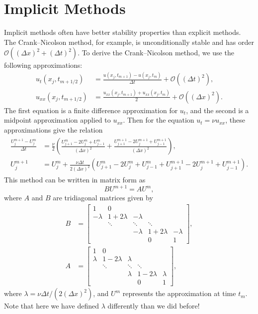 \section*{Implicit Methods}

Implicit methods often have better stability properties than explicit methods.
The Crank--Nicolson method, for example, is unconditionally stable and has order $\mathcal{O}\left( (\Delta x)^2 + (\Delta t)^2 \right)$.
To derive the Crank--Nicolson method, we use the following approximations:
\begin{align*}
	u_t(x_j,t_{m+1/2}) &= \frac{u(x_j,t_{m+1}) - u(x_j,t_m)}{\Delta t} + \mathcal{O}\left( (\Delta t)^2 \right), \\
	u_{xx}(x_j,t_{m+1/2}) &= \frac{u_{xx}(x_j,t_{m+1}) + u_{xx}(x_j,t_m)}{2} + \mathcal{O}\left( (\Delta x)^2 \right).
\end{align*}
The first equation is a finite difference approximation for $u_t$, and the second is a midpoint approximation applied to $u_{xx}$.
Then for the equation $u_t = \nu u_{xx}$, these approximations give the relation
\begin{align}
	\begin{split}
	\frac{U^{m+1}_j - U^m_j}{\Delta t} &= \frac{\nu}{2}\left( \frac{U^m_{j+1} - 2U^m_{j} + U^m_{j-1}}{(\Delta x)^2} + \frac{U^{m+1}_{j+1} - 2U^{m+1}_{j} + U^{m+1}_{j-1}}{(\Delta x)^2}  \right) ,\\
	U^{m+1}_j  &= U^m_j + \frac{\nu \Delta t}{2 (\Delta x)^2} \left( U^m_{j+1} - 2U^m_{j} + U^m_{j-1} + U^{m+1}_{j+1} - 2U^{m+1}_{j} + U^{m+1}_{j-1}   \right).
\end{split}
\end{align}
This method can be written in matrix form as
\[BU^{m+1} = A U^m,\]
where $A$ and $B$ are tridiagonal matrices given by
\begin{align*}
B &= \left[\begin{array}{cccccc}1 & 0 &  &  &  \\ -\lambda & 1+2\lambda &  -\lambda & &  \\ &  \ddots &   \ddots & \ddots \\ & &  -\lambda &  1+2\lambda & -\lambda \\ &  &  & 0 & 1\end{array}\right], \\
A &= \left[\begin{array}{cccccc}1 & 0 &  &  &  \\ \lambda & 1-2\lambda &  \lambda & &  \\ &  \ddots &   \ddots & \ddots \\ & &  \lambda &  1-2\lambda & \lambda \\ &  &  & 0 & 1\end{array}\right],
\end{align*}
where $\lambda = \nu \Delta t / \left(2 (\Delta x)^2 \right)$, and $U^m$ represents the approximation at time $t_m$.
Note that here we have defined $\lambda$ differently than we did before!

